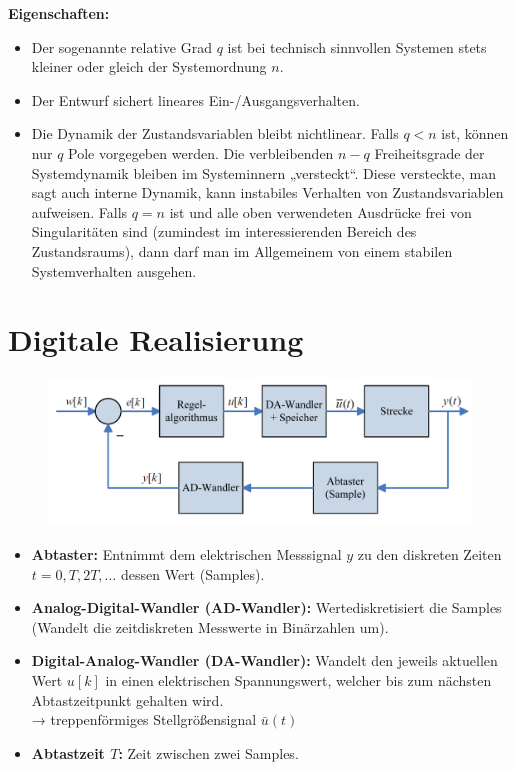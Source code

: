 \documentclass[10pt,a4paper]{article}
\begin{document}
\textbf{Eigenschaften:}
\begin{itemize}
	\item Der sogenannte relative Grad $q$ ist bei technisch sinnvollen Systemen stets kleiner oder gleich der Systemordnung $n$.
	\item Der Entwurf sichert lineares Ein-/Ausgangsverhalten.
	\item Die Dynamik der Zustandsvariablen bleibt nichtlinear.	Falls $q < n$ ist, können nur $q$ Pole vorgegeben werden. Die verbleibenden $n − q$ Freiheitsgrade der Systemdynamik bleiben im Systeminnern „versteckt“. Diese versteckte, man sagt auch interne Dynamik, kann instabiles Verhalten von Zustandsvariablen aufweisen. Falls $q = n$ ist und alle oben verwendeten Ausdrücke frei von Singularitäten sind (zumindest im interessierenden Bereich des Zustandsraums), dann darf man im Allgemeinem von einem stabilen Systemverhalten ausgehen.
\end{itemize}

\section{Digitale Realisierung}
\begin{figure}[H]
	\includegraphics[width=\columnwidth]{imgs/abb8_1.png}
\end{figure}

\begin{itemize}
	\item \textbf{Abtaster:} Entnimmt dem elektrischen Messsignal $y$ zu den diskreten Zeiten $t = 0, T, 2T, \dots$ dessen Wert (Samples).
	\item \textbf{Analog-Digital-Wandler (AD-Wandler):} Wertediskretisiert die Samples (Wandelt die zeitdiskreten Messwerte in Binärzahlen um).
	\item \textbf{Digital-Analog-Wandler (DA-Wandler):} Wandelt den jeweils aktuellen Wert $u[k]$ in einen elektrischen Spannungswert, welcher bis zum nächsten Abtastzeitpunkt gehalten wird. \\
	→ treppenförmiges Stellgrößensignal $\bar u(t)$
	\item \textbf{Abtastzeit $T$:} Zeit zwischen zwei Samples.
\end{itemize}
\end{document}
